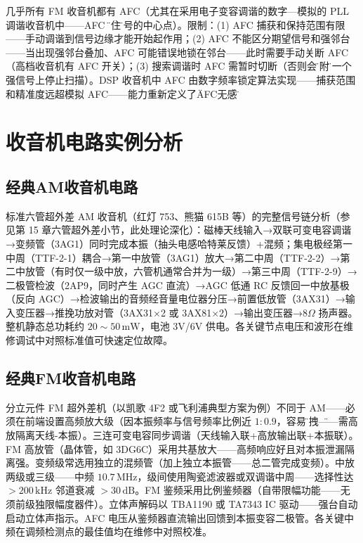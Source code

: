 \documentclass[12pt,UTF8]{ctexbook}
\begin{document}
几乎所有 FM 收音机都有 AFC（尤其在采用电子变容调谐的数字—模拟的 PLL 调谐收音机中——AFC \"粘住\"信号的中心点）。限制：(1) AFC 捕获和保持范围有限——手动调谐到信号边缘才能开始起作用；(2) AFC 不能区分期望信号和强邻台——当出现强邻台叠加、AFC 可能错误地锁在邻台——此时需要手动关断 AFC（高档收音机有 AFC 开关）；(3) 搜索调谐时 AFC 需暂时切断（否则会\"粘附\"在一个强信号上停止扫描）。DSP 收音机中 AFC 由数字频率锁定算法实现——捕获范围和精准度远超模拟 AFC——能力重新定义了\"AFC无感\"。

\section{收音机电路实例分析}
\label{sec:rx_circuit_examples}

\subsection{经典AM收音机电路}

标准六管超外差 AM 收音机（红灯 753、熊猫 615B 等）的完整信号链分析（参见第 15 章六管超外差小节，此处理论深化）：磁棒天线输入→双联可变电容调谐→变频管（3AG1）同时完成本振（抽头电感哈特莱反馈）+混频；集电极经第一中周（TTF-2-1）耦合→第一中放管（3AG1）放大→第二中周（TTF-2-2）→第二中放管（有时仅一级中放，六管机通常合并为一级）→第三中周（TTF-2-9）→二极管检波（2AP9，同时产生 AGC 直流）→AGC 低通 RC 反馈回一中放基极（反向 AGC）→检波输出的音频经音量电位器分压→前置低放管（3AX31）→输入变压器→推挽功放对管（3AX31×2 或 3AX81×2）→输出变压器→$8\Omega$ 扬声器。整机静态总功耗约 $20\sim50\,\mathrm{mW}$，电池 3V/6V 供电。各关键节点电压和波形在维修调试中对照标准值可快速定位故障。

\subsection{经典FM收音机电路}

分立元件 FM 超外差机（以凯歌 4F2 或飞利浦典型方案为例）不同于 AM——必须在前端设置高频放大级（因本振频率与信号频率比例近 $1:0.9$，容易\"拖拽\"——需高放隔离天线-本振）。三连可变电容同步调谐（天线输入联+高放输出联+本振联）。FM 高放管（晶体管，如 3DG6C）采用共基放大——高频响应好且对本振泄漏隔离强。变频级常选用独立的混频管（加上独立本振管——总二管完成变频）。中放两级或三级——中频 $10.7\,\mathrm{MHz}$，级间使用陶瓷滤波器或双调谐中周——选择性达 $>200\,\mathrm{kHz}$ 邻道衰减 $>30\,\mathrm{dB}$。FM 鉴频采用比例鉴频器（自带限幅功能——无须前级独限幅度器件）。立体声解码以 TBA1190 或 TA7343 IC 驱动——强台自动启动立体声指示。AFC 电压从鉴频器直流输出回馈到本振变容二极管。各关键中频在调频检测点的最佳值均在维修中对照校准。
\end{document}
